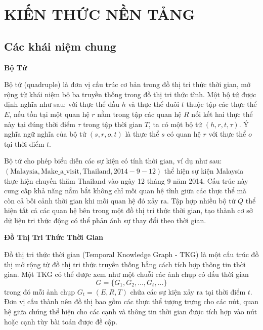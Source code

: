 \chapter{KIẾN THỨC NỀN TẢNG}
\label{Chapter3}


\section{Các khái niệm chung}

\textbf{Bộ Tứ}

Bộ tứ (quadruple) là đơn vị cấu trúc cơ bản trong đồ thị tri thức thời gian, mở rộng từ khái niệm bộ ba truyền thống trong đồ thị tri thức tĩnh. Một bộ tứ được định nghĩa như sau: với thực thể đầu $h$ và thực thể đuôi $t$ thuộc tập các thực thể $E$, nếu tồn tại một quan hệ $r$ nằm trong tập các quan hệ $R$ nối kết hai thực thể này tại đúng thời điểm $\tau$ trong tập thời gian $T$, ta có một bộ tứ $(h, r, t, \tau)$. Ý nghĩa ngữ nghĩa của bộ tứ $(s, r, o, t)$ là thực thể $s$ có quan hệ $r$ với thực thể $o$ tại thời điểm $t$.

Bộ tứ cho phép biểu diễn các sự kiện có tính thời gian, ví dụ như sau: $(\text{Malaysia}, \text{Make\_a\_visit}, \text{Thailand}, 2014-9-12)$ thể hiện sự kiện Malaysia thực hiện chuyến thăm Thailand vào ngày 12 tháng 9 năm 2014. Cấu trúc này cung cấp khả năng nắm bắt không chỉ mối quan hệ tĩnh giữa các thực thể mà còn cả bối cảnh thời gian khi mối quan hệ đó xảy ra. Tập hợp nhiều bộ tứ $Q$ thể hiện tất cả các quan hệ bên trong một đồ thị tri thức thời gian, tạo thành cơ sở dữ liệu tri thức động có thể phản ánh sự thay đổi theo thời gian.

\vspace{1em}
\textbf{Đồ Thị Tri Thức Thời Gian}

Đồ thị tri thức thời gian (Temporal Knowledge Graph - TKG) là một cấu trúc đồ thị mở rộng từ đồ thị tri thức truyền thống bằng cách tích hợp thông tin thời gian. Một TKG có thể được xem như một chuỗi các ảnh chụp có dấu thời gian 
\[
G = \{G_1, G_2, ..., G_t, ...\}
\]
trong đó mỗi ảnh chụp $G_t = (E, R, T)$ chứa các sự kiện xảy ra tại thời điểm $t$. Đơn vị cấu thành nên đồ thị bao gồm các thực thể tượng trưng cho các nút, quan hệ giữa chúng thể hiện cho các cạnh và thông tin thời gian được tích hợp vào nút hoặc cạnh tùy bài toán được đề cập.

